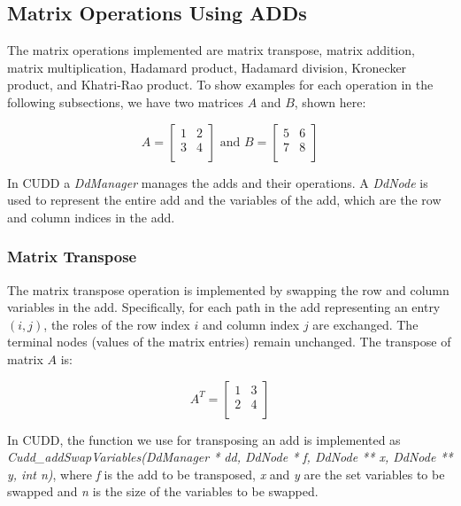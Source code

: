 
\subsection{Matrix Operations Using ADDs}\label{subsec:matrix-operations-using-adds}
The matrix operations implemented are matrix transpose, matrix addition, matrix multiplication, Hadamard product, Hadamard division, Kronecker product, and Khatri-Rao product.
To show examples for each operation in the following subsections, we have two matrices $A$ and $B$, shown here:

\[
    A = \begin{bmatrix}
            1 & 2 \\
            3 & 4 \\
    \end{bmatrix}
    \text{ and }
    B = \begin{bmatrix}
            5 & 6 \\
            7 & 8 \\
    \end{bmatrix}
\]

In CUDD a \textit{DdManager} manages the \glspl{add} and their operations.
A \textit{DdNode} is used to represent the entire \gls{add} and the variables of the \gls{add}, which are the row and column indices in the \gls{add}.

\subsubsection{Matrix Transpose}
The matrix transpose operation is implemented by swapping the row and column variables in the \gls{add}.
Specifically, for each path in the \gls{add} representing an entry $(i, j)$, the roles of the row index
$i$ and column index $j$ are exchanged.
The terminal nodes (values of the matrix entries) remain unchanged.
The transpose of matrix $A$ is:

\[
    A^T = \begin{bmatrix}
              1 & 3 \\
              2 & 4 \\
    \end{bmatrix}
\]

In CUDD, the function we use for transposing an \gls{add} is implemented as \textit{Cudd\_addSwapVariables(DdManager * dd, DdNode * f, DdNode ** x, DdNode ** y, int n)}, where \textit{f} is the \gls{add} to be transposed, \textit{x} and \textit{y} are the set variables to be swapped and \textit{n} is the size of the variables to be swapped.

